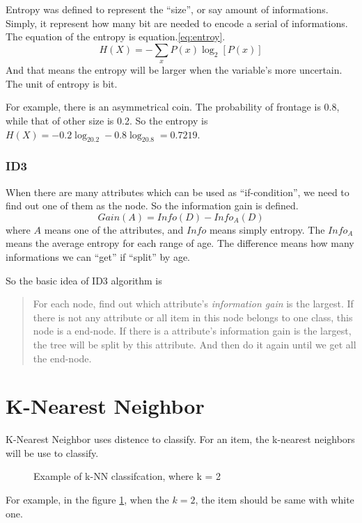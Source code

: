 \documentclass{article}
\begin{document}
Entropy was defined to represent the ``size'', or say amount of informations.
Simply, it represent how many bit are needed to encode a serial of informations.
The equation of the entropy is equation.\ref{eq:entroy}.
\begin{equation}
  \label{eq:entropy}
  H(X) = - \sum\limits_x P(x)\log_2\left[P(x)\right]
\end{equation}
And that means the entropy will be larger when the variable's more uncertain.
The unit of entropy is bit.

For example, there is an asymmetrical coin. The probability of frontage is 0.8,
while that of other size is 0.2.
So the entropy is $H(X) = - 0.2\log_20.2 - 0.8\log_20.8 = 0.7219$.

\subsubsection{ID3}
\label{sec:dt:how:id3}

When there are many attributes which can be used as ``if-condition'',
we need to find out one of them as the node. So the information gain is defined.
\begin{equation}
  \label{eq:inforgain}
  Gain(A) = Info(D) - Info_A(D)
\end{equation}
where $A$ means one of the attributes, and $Info$ means simply entropy.
The $Info_A$ means the average entropy for each range of age.
The difference means how many informations we can ``get'' if ``split'' by age.

So the basic idea of ID3 algorithm is 
\begin{quote}
  For each node, find out which attribute's \textit{information gain} is the largest.
  If there is not any attribute or all item in this node belongs to one class, this node is a end-node.
  If there is a attribute's information gain is the largest, the tree will be split by this attribute.
  And then do it again until we get all the end-node.
\end{quote}

\section{K-Nearest Neighbor}
\label{sec:knn}

K-Nearest Neighbor uses distence to classify. For an item, the k-nearest neighbors will be use
to classify.
\begin{figure}
  \centering
  \caption{Example of k-NN classifcation, where k = 2}
  \label{fig:knn:eg}
\end{figure}
For example, in the figure \ref{fig:knn:eg}, when the $k=2$, the item should be same with white one.
\end{document}
